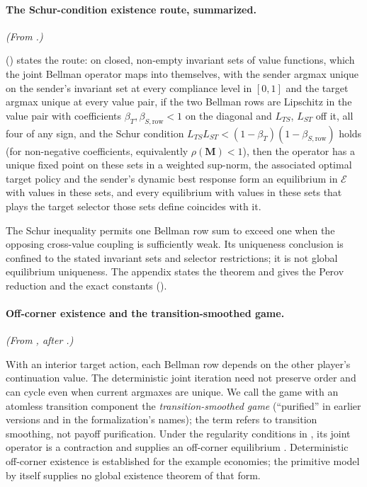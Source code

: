 \paragraph{The Schur-condition existence route, summarized.} \emph{(From .)}

 () states the route: on
closed, non-empty invariant sets of value functions, which the joint Bellman operator maps into
themselves, with the sender argmax unique on the sender's invariant set at every
compliance level in $[0,1]$ and the target argmax unique at every value pair,
if the two Bellman rows are Lipschitz in
the value pair with coefficients $\beta_T,\beta_{S,\mathrm{row}}<1$ on the
diagonal and $L_{TS}$, $L_{ST}$ off it, all four of any sign, and the Schur
condition $L_{TS}L_{ST}<(1-\beta_T)(1-\beta_{S,\mathrm{row}})$ holds (for non-negative
coefficients, equivalently $\rho(\mathbf M)<1$), then the operator has a unique
fixed point on these sets in a weighted sup-norm, the associated optimal target
policy and the sender's dynamic best response form an equilibrium in $\mathcal E$ with
values in these sets, and every equilibrium with values in these sets that
plays the target selector those sets define coincides with it.

The Schur inequality permits one Bellman row sum to exceed one when the
opposing cross-value coupling is sufficiently weak. Its uniqueness
conclusion is confined to the stated invariant sets and selector restrictions;
it is not global equilibrium uniqueness. The appendix states the theorem and
gives the Perov reduction and the exact constants
().

\paragraph{Off-corner existence and the transition-smoothed game.} \emph{(From , after .)}

With an interior target action, each Bellman row depends on the other
player's continuation value. The deterministic joint iteration need not
preserve order and can cycle even when current argmaxes are unique. We
call the game with an atomless transition component the
\emph{transition-smoothed game} (``purified'' in earlier versions and in the
formalization's names); the term refers to transition smoothing, not payoff
purification.
Under the regularity conditions in , its
joint operator is a contraction and supplies an off-corner equilibrium
\citep{HeSun2017,DoraszelskiSatterthwaite2010}. Deterministic off-corner
existence is established for the example economies; the primitive
model by itself supplies no global existence theorem of that form.

